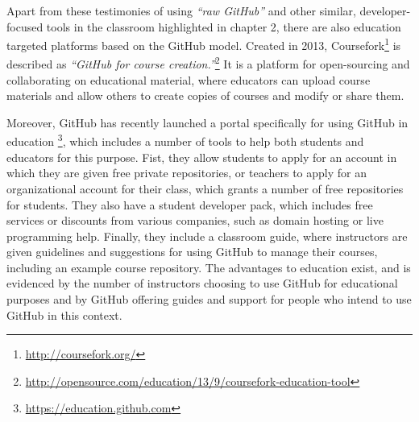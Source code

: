 Apart from these testimonies of using \textit{``raw GitHub''} and other similar, developer-focused tools in the classroom highlighted in chapter 2, there are also education targeted platforms based on the GitHub model. Created in 2013, Coursefork\footnote{\url{http://coursefork.org/}} is described as \textit{``GitHub for course creation.''}\footnote{\url{http://opensource.com/education/13/9/coursefork-education-tool}} It is a platform for open-sourcing and collaborating on educational material, where educators can upload course materials and allow others to create copies of courses and modify or share them.

Moreover, GitHub has recently launched a portal specifically for using GitHub in education \footnote{\url{https://education.github.com}}, which includes a number of tools to help both students and educators for this purpose. Fist, they allow students to apply for an account in which they are given free private repositories, or teachers to apply for an organizational account for their class, which grants a number of free repositories for students. They also have a student developer pack, which includes free services or discounts from various companies, such as domain hosting or live programming help. Finally, they include a classroom guide, where instructors are given guidelines and suggestions for using GitHub to manage their courses, including an example course repository. The advantages to education exist, and is evidenced by the number of instructors choosing to use GitHub for educational purposes and by GitHub offering guides and support for people who intend to use GitHub in this context.
